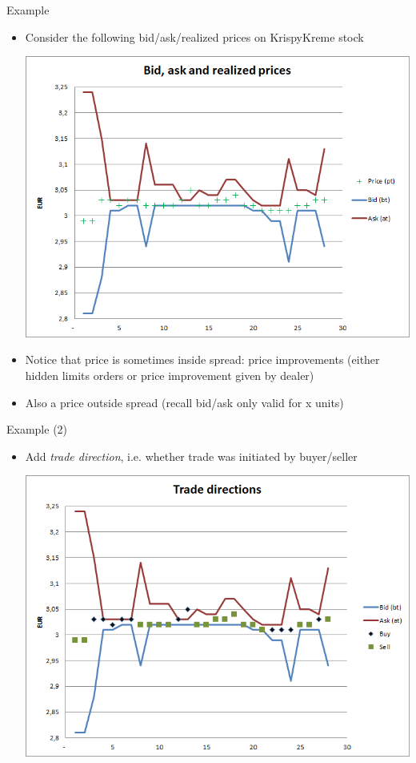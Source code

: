 \begin{frame}{Example}
	\begin{itemize}
		\item Consider the following bid/ask/realized prices on KrispyKreme stock
		\begin{center}
			\includegraphics[scale=0.34]{pics/L2_bidask}
		\end{center}
		\item Notice that price is sometimes inside spread: price improvements (either hidden limits orders or price improvement given by dealer)
		\item Also a price outside spread (recall bid/ask only valid for x units)
	\end{itemize}
\end{frame}


\begin{frame}{Example (2)}
	\begin{itemize}
		\item Add \textit{trade direction}, i.e. whether trade was initiated by buyer/seller
		\begin{center}
			\includegraphics[scale=0.39]{pics/L2_directions}
		\end{center}
	\end{itemize}
\end{frame}


